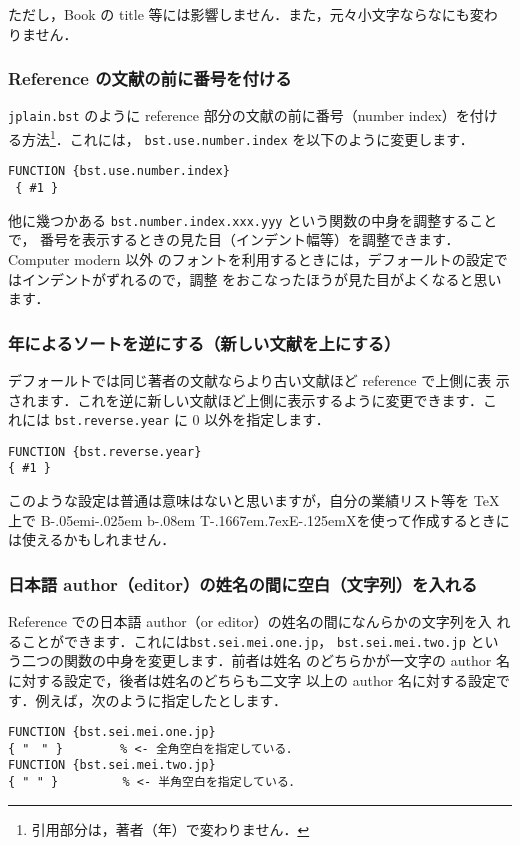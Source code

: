 \documentclass[a4j,10pt]{jarticle}
\def\BibTeX{{\rm B\kern-.05em{\sc i\kern-.025em b}\kern-.08em
    T\kern-.1667em\lower.7ex\hbox{E}\kern-.125emX}}
\begin{document}
ただし，Book の title 等には影響しません．また，元々小文字ならなにも変わ
りません．

\subsubsection{Reference の文献の前に番号を付ける}

\texttt{jplain.bst} のように reference 部分の文献の前に番号（number index）を付け
る方法\footnote{引用部分は，著者（年）で変わりません．}．これには，
\texttt{bst.use.number.index} を以下のように変更します．
\begin{screen}
\begin{verbatim}
FUNCTION {bst.use.number.index}
 { #1 }
\end{verbatim}
\end{screen}

他に幾つかある \texttt{bst.number.index.xxx.yyy} という関数の中身を調整することで，
番号を表示するときの見た目（インデント幅等）を調整できます．Computer modern 以外
のフォントを利用するときには，デフォールトの設定ではインデントがずれるので，調整
をおこなったほうが見た目がよくなると思います．

\subsubsection{年によるソートを逆にする（新しい文献を上にする）}

デフォールトでは同じ著者の文献ならより古い文献ほど reference で上側に表
示されます．これを逆に新しい文献ほど上側に表示するように変更できます．こ
れには \texttt{bst.reverse.year} に 0 以外を指定します．
\begin{screen}
\begin{verbatim}
FUNCTION {bst.reverse.year}
{ #1 }
\end{verbatim}
\end{screen}

このような設定は普通は意味はないと思いますが，自分の業績リスト等を \TeX 
上で \BibTeX を使って作成するときには使えるかもしれません．

\subsubsection{日本語 author（editor）の姓名の間に空白（文字列）を入れる}

Reference での日本語 author（or editor）の姓名の間になんらかの文字列を入
れることができます．これには\verb|bst.sei.mei.one.jp|，
\verb|bst.sei.mei.two.jp| という二つの関数の中身を変更します．前者は姓名
のどちらかが一文字の author 名に対する設定で，後者は姓名のどちらも二文字
以上の author 名に対する設定です．例えば，次のように指定したとします．
\begin{screen}
\begin{verbatim}
FUNCTION {bst.sei.mei.one.jp}
{ "　" }        % <- 全角空白を指定している．
FUNCTION {bst.sei.mei.two.jp}
{ " " }         % <- 半角空白を指定している．
\end{verbatim}
\end{screen}
\end{document}

